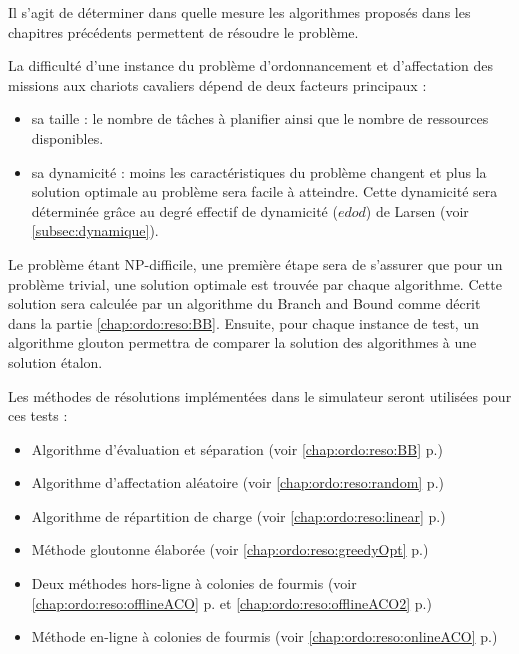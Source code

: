 
  Il s'agit de déterminer dans quelle mesure les algorithmes proposés dans les chapitres précédents permettent de résoudre le problème.

  La difficulté d'une instance du problème d'ordonnancement et d'affectation des missions aux chariots cavaliers dépend de deux facteurs principaux :
  \begin{itemize}
    \item sa taille : le nombre de tâches à planifier ainsi que le nombre de ressources disponibles.
    \item sa dynamicité : moins les caractéristiques du problème changent et plus la solution optimale au problème sera facile à atteindre. Cette dynamicité sera déterminée grâce au degré effectif de dynamicité ($edod$) de Larsen (voir \ref{subsec:dynamique}).
  \end{itemize}

  Le problème étant NP-difficile, une première étape sera de s'assurer que pour un problème trivial, une solution optimale est trouvée par chaque algorithme. Cette solution sera calculée par un algorithme du Branch and Bound comme décrit dans la partie \ref{chap:ordo:reso:BB}.  Ensuite, pour chaque instance de test, un algorithme glouton permettra de comparer la solution des algorithmes à une solution étalon. 

  Les méthodes de résolutions implémentées dans le simulateur seront utilisées pour ces tests :
  \begin{itemize}
  \item Algorithme d'évaluation et séparation (voir \ref{chap:ordo:reso:BB} p.\pageref{chap:ordo:reso:BB})
  \item Algorithme d'affectation aléatoire (voir \ref{chap:ordo:reso:random} p.\pageref{chap:ordo:reso:random})
  \item Algorithme de répartition de charge (voir \ref{chap:ordo:reso:linear} p.\pageref{chap:ordo:reso:linear})
  \item Méthode gloutonne élaborée (voir \ref{chap:ordo:reso:greedyOpt} p.\pageref{chap:ordo:reso:greedyOpt})
  \item Deux méthodes hors-ligne à colonies de fourmis (voir \ref{chap:ordo:reso:offlineACO} p.\pageref{chap:ordo:reso:offlineACO} et \ref{chap:ordo:reso:offlineACO2} p.\pageref{chap:ordo:reso:offlineACO2})
  \item Méthode en-ligne à colonies de fourmis (voir \ref{chap:ordo:reso:onlineACO} p.\pageref{chap:ordo:reso:onlineACO})
  \end{itemize}

